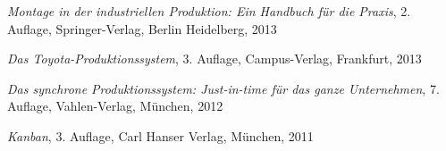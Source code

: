 \newpage
{}
  \begin{thebibliography}{}



%

	 {\sl Montage in der industriellen Produktion: Ein Handbuch für die Praxis}, 2. Auflage, Springer-Verlag, Berlin Heidelberg, 2013
	
	 {\sl Das Toyota-Produktionssystem}, 3. Auflage, Campus-Verlag, Frankfurt, 2013

	 {\sl Das synchrone Produktionssystem: Just-in-time für das ganze Unternehmen}, 7. Auflage, Vahlen-Verlag, München, 2012

	 {\sl Kanban}, 3. Auflage, Carl Hanser Verlag, München, 2011
	

\end{thebibliography}
